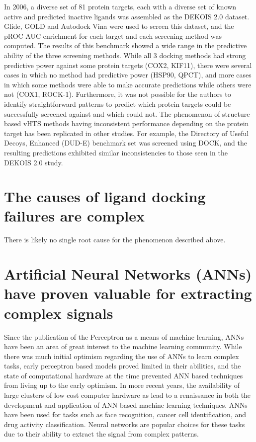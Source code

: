 In 2006, a diverse set of 81 protein targets, each with a diverse set of known active and predicted inactive ligands was assembled as the DEKOIS 2.0 dataset\citep{Bauer:2013de}.
Glide, GOLD and Autodock Vina were used to screen this dataset, and the pROC AUC enrichment for each target and each screening method was computed.
The results of this benchmark showed a wide range in the predictive ability of the three screening methods.  
While all 3 docking methods had strong predictive power against some protein targets (COX2, KIF11), there were several cases in which no method had predictive power (HSP90, QPCT), and more cases in which some methods were able to make accurate predictions while others were not (COX1, ROCK-1).
Furthermore, it was not possible for the authors to identify straightforward patterns to predict which protein targets could be successfully screened against and which could not. 
The phenomenon of structure based vHTS methods having inconsistent performance depending on the protein target has been replicated in other studies.
For example, the Directory of Useful Decoys, Enhanced (DUD-E) benchmark set was screened using DOCK, and the resulting predictions exhibited similar inconsistencies to those seen in the DEKOIS 2.0 study\citep{Mysinger:2012hu}.

\section{The causes of ligand docking failures are complex}

There is likely no single root cause for the phenomenon described above.

\section{Artificial Neural Networks (ANNs) have proven valuable for extracting complex signals}

Since the publication of the Perceptron as a means of machine learning\citep{Rosenblatt:1958jc}, ANNs have been an area of great interest to the machine learning community.
While there was much initial optimism regarding the use of ANNs to learn complex tasks, early perceptron based models proved limited in their abilities\citep{Gallant:1990hk}, and the state of computational hardware at the time prevented ANN based techniques from living up to the early optimism.
In more recent years, the availability of large clusters of low cost computer hardware as lead to a renaissance in both the development and application of ANN based machine learning techniques.
ANNs have been used for tasks such as face recognition\citep{Zhao:2003bf}, cancer cell identification\citep{Zhou:2002ew}, and drug activity classification\citep{Gohlke:2002in}.
Neural networks are popular choices for these tasks due to their ability to extract the signal from complex patterns.

